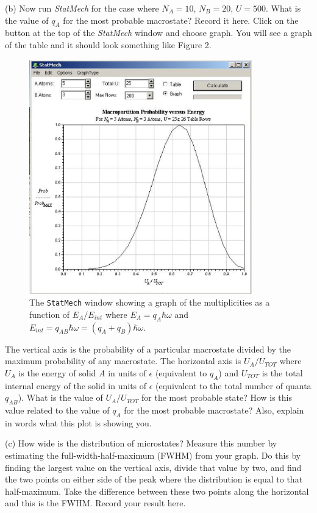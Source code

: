 (b) Now run {\it StatMech} for the case where $N_A = 10$, $N_B=20$, $U = 500$.
What is the value of $q_A$ for the most probable macrostate? 
Record it here.
Click on the button at the top of the {\it StatMech} window and choose graph.
You will see a graph of the table  and it should look something like
Figure 2.
\begin{figure}[!ht]
\begin{center}
\includegraphics[height=4.0in]{einstein_solid/statmech2.eps}
\caption{The {\tt StatMech} window showing a graph of the multiplicities as a function
of $E_A/E_{int}$ where $E_A = q_A \hbar \omega$ and 
$E_{int} = q_{AB} \hbar \omega = (q_A+q_B)\hbar \omega$.}
\end{center}
\end{figure}
The vertical axis is the probability of a particular macrostate divided by the maximum
probability of any macrostate.
The horizontal axis is  $U_A/U_{TOT}$ where 
$U_A$ is the energy of solid $A$ in units of $\epsilon$ (equivalent to $q_A$) and $U_{TOT}$ is the total
internal energy of the solid in units of $\epsilon$ (equivalent 
to the total number of quanta $q_{AB}$).
What is the value of $U_A/U_{TOT}$ for the most probable state?
How is this value related to the value of $q_A$ for the most probable macrostate? 
Also, explain in words what this plot is showing you.
\vspace{25mm}

(c) How wide is the distribution of microstates?
Measure this number by estimating the full-width-half-maximum (FWHM) from your graph.
Do this by finding the largest value on the vertical axis, divide that value by two, and find
the two points on either side of the peak where the distribution is equal to that
half-maximum.
Take the difference between these two points along the horizontal and this is the FWHM.
Record your result here.
\answerspace{20mm}

